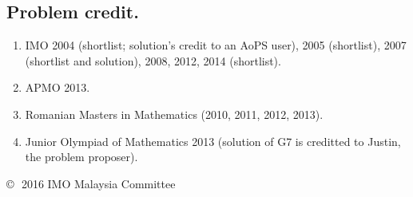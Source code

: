 \documentclass[11pt,a4paper]{article}
\begin{document}
\subsection {Problem credit.}
\begin {enumerate}
\item IMO 2004 (shortlist; solution's credit to an AoPS user), 2005 (shortlist), 2007 (shortlist and solution), 2008, 2012, 2014 (shortlist).
\item APMO 2013.
\item Romanian Masters in Mathematics (2010, 2011, 2012, 2013).
\item Junior Olympiad of Mathematics 2013 (solution of G7 is creditted to Justin, the problem proposer).
\end {enumerate}
\vspace{5mm} \noindent \copyright \,\, 2016 IMO Malaysia Committee
\end{document}
